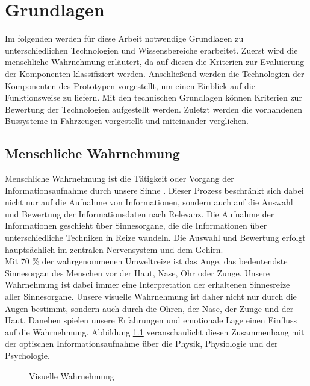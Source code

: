 \chapter{Grundlagen}
\label{cha:Grundlagen}
Im folgenden werden für diese Arbeit notwendige Grundlagen zu unterschiedlichen Technologien und Wissensbereiche erarbeitet. 
Zuerst wird die menschliche Wahrnehmung erläutert, da auf diesen die Kriterien zur Evaluierung der Komponenten klassifiziert werden. Anschließend werden die Technologien der Komponenten des Prototypen vorgestellt, um einen Einblick auf die Funktionsweise zu liefern. Mit den technischen Grundlagen können Kriterien zur Bewertung der Technologien aufgestellt werden. Zuletzt werden die vorhandenen Bussysteme in Fahrzeugen vorgestellt und miteinander verglichen.
\section{Menschliche Wahrnehmung}
Menschliche Wahrnehmung ist die \glqq Tätigkeit oder Vorgang der Informationsaufnahme durch unsere Sinne\grqq{} \cite[Seite 12]{Buhler.2017}. Dieser Prozess beschränkt sich dabei nicht nur auf die Aufnahme von Informationen, sondern auch auf die Auswahl und Bewertung der Informationsdaten nach Relevanz. Die Aufnahme der Informationen geschieht über Sinnesorgane, die die Informationen über unterschiedliche Techniken in Reize wandeln. Die Auswahl und Bewertung erfolgt hauptsächlich im zentralen Nervensystem und dem Gehirn. \cite[Vgl. Seite 12]{Buhler.2017}\\
Mit 70 \% der wahrgenommenen Umweltreize ist das Auge, das bedeutendste Sinnesorgan des Menschen vor der Haut, Nase, Ohr oder Zunge. Unsere Wahrnehmung ist dabei immer eine Interpretation der erhaltenen Sinnesreize aller Sinnesorgane. Unsere visuelle Wahrnehmung ist daher nicht nur durch die Augen bestimmt, sondern auch durch die Ohren, der Nase, der Zunge und der Haut. Daneben spielen unsere Erfahrungen und emotionale Lage einen Einfluss auf die Wahrnehmung. \cite[Vgl. Seite 10 ff.]{Steiner.2020}
Abbildung \ref{fig:information} veranschaulicht diesen Zusammenhang mit der optischen Informationsaufnahme über die Physik, Physiologie und der Psychologie. \cite[Vgl. Seite 13 f.]{Buhler.2017}\\
\begin{figure}[hbt]
	\centering
	
	\caption[Visuelle Wahrnehmung]{Visuelle Wahrnehmung}
	\label{fig:information}
\end{figure}

